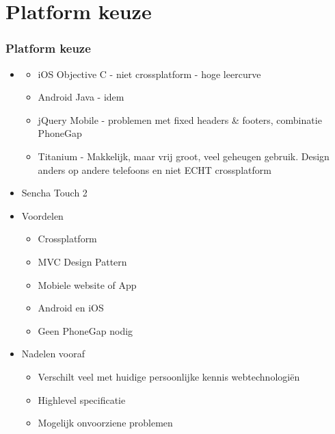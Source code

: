 \documentclass[10pt,a4paper]{beamer}
\begin{document}
\section{Platform keuze}
\begin{frame}
\frametitle{Platform keuze}
\begin{itemize}
\item 
	\begin{itemize}
		\item iOS Objective C - niet crossplatform - hoge leercurve
			\item Android Java - idem
		\item jQuery Mobile -  problemen met fixed headers \& footers, combinatie PhoneGap
		\item Titanium - Makkelijk, maar vrij groot, veel geheugen gebruik. Design anders op andere telefoons en niet ECHT crossplatform
	\end{itemize}
\item Sencha Touch 2
\item Voordelen
		\begin{itemize}
		\item Crossplatform
		\item MVC Design Pattern
		\item Mobiele website of App
		\item Android en iOS
		\item Geen PhoneGap nodig
		\end{itemize}
\item Nadelen vooraf
		\begin{itemize}
				\item Verschilt veel met huidige persoonlijke kennis webtechnologiën
				\item Highlevel specificatie
				\item Mogelijk onvoorziene problemen
		\end{itemize}
\end{itemize}
\end{frame}
\end{document}
